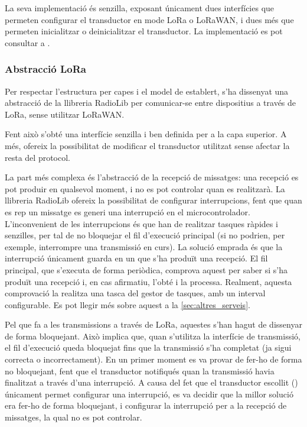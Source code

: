 \documentclass{tfgitic}[2024/07/01]
\begin{document}
La seva implementació és senzilla, exposant únicament dues interfícies que permeten configurar el transductor en mode LoRa o LoRaWAN, i dues més que permeten inicialitzar o deinicialitzar el transductor. La implementació es pot consultar a . 

\subsubsection{Abstracció LoRa}
Per respectar l'estructura per capes i el model de  establert, s'ha dissenyat una abstracció de la llibreria RadioLib per comunicar-se entre dispositius a través de LoRa, sense utilitzar LoRaWAN.

Fent això s'obté una interfície senzilla i ben definida per a la capa superior. A més, ofereix la possibilitat de modificar el transductor utilitzat sense afectar la resta del protocol. 

La part més complexa és l'abstracció de la recepció de missatges: una recepció es pot produir en qualsevol moment, i no es pot controlar quan es realitzarà. La llibreria RadioLib ofereix la possibilitat de configurar interrupcions, fent que quan es rep un missatge es generi una interrupció en el microcontrolador. L'inconvenient de les interrupcions és que han de realitzar tasques ràpides i senzilles, per tal de no bloquejar el fil d'execució principal (si no podrien, per exemple, interrompre una transmissió en curs). La solució emprada és que la interrupció únicament guarda en un  que s'ha produït una recepció. El fil principal, que s'executa de forma periòdica, comprova aquest  per saber si s'ha produït una recepció i, en cas afirmatiu, l'obté i la processa. Realment, aquesta comprovació la realitza una tasca del gestor de tasques, amb un interval configurable. Es pot llegir més sobre aquest a la \autoref{sec:altres_serveis}.

Pel que fa a les transmissions a través de LoRa, aquestes s'han hagut de dissenyar de forma bloquejant. Això implica que, quan s'utilitza la interfície de transmissió, el fil d'execució queda bloquejat fins que la transmissió s'ha completat (ja sigui correcta o incorrectament). En un primer moment es va provar de fer-ho de forma no bloquejant, fent que el transductor notifiqués quan la transmissió havia finalitzat a través d'una interrupció. A causa del fet que el transductor escollit () únicament permet configurar una interrupció, es va decidir que la millor solució era fer-ho de forma bloquejant, i configurar la interrupció per a la recepció de missatges, la qual no es pot controlar.
\end{document}
